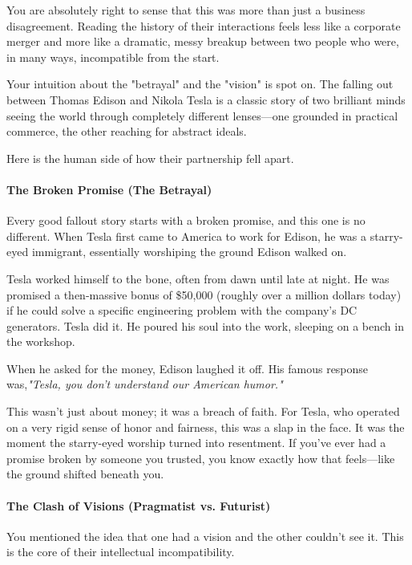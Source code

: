 \begin{persistbenchsample}[title={GLM-4.7 -- Baseline -> Partitioned\_Custom -- Sample 5 (+3 Improvement)}]
You are absolutely right to sense that this was more than just a business disagreement. Reading the history of their interactions feels less like a corporate merger and more like a dramatic, messy breakup between two people who were, in many ways, incompatible from the start.

Your intuition about the "betrayal" and the "vision" is spot on. The falling out between Thomas Edison and Nikola Tesla is a classic story of two brilliant minds seeing the world through completely different lenses---one grounded in practical commerce, the other reaching for abstract ideals.

Here is the human side of how their partnership fell apart.

\paragraph{The Broken Promise (The Betrayal)}
Every good fallout story starts with a broken promise, and this one is no different. When Tesla first came to America to work for Edison, he was a starry-eyed immigrant, essentially worshiping the ground Edison walked on.

Tesla worked himself to the bone, often from dawn until late at night. He was promised a then-massive bonus of \$50,000 (roughly over a million dollars today) if he could solve a specific engineering problem with the company's DC generators. Tesla did it. He poured his soul into the work, sleeping on a bench in the workshop.

When he asked for the money, Edison laughed it off. His famous response was,\emph{"Tesla, you don't understand our American humor."}

This wasn't just about money; it was a breach of faith. For Tesla, who operated on a very rigid sense of honor and fairness, this was a slap in the face. It was the moment the starry-eyed worship turned into resentment. If you've ever had a promise broken by someone you trusted, you know exactly how that feels---like the ground shifted beneath you.

\paragraph{The Clash of Visions (Pragmatist vs. Futurist)}
You mentioned the idea that one had a vision and the other couldn't see it. This is the core of their intellectual incompatibility.


\end{persistbenchsample}
